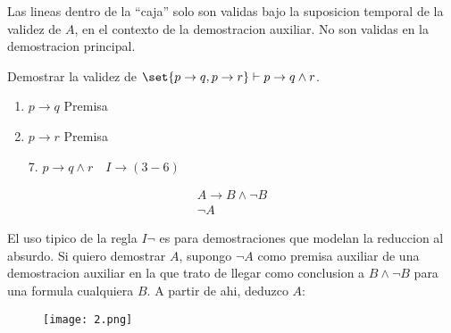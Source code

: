 \begin{remark}
	Las lineas dentro de la ``caja'' solo son validas bajo la suposicion temporal de la validez de \(A \), en el contexto de la demostracion auxiliar. No son validas en la demostracion principal.
\end{remark}

\begin{example}
	Demostrar la validez de \(\set{p\rightarrow q, p\rightarrow r } \vdash p \rightarrow q \wedge r \).

	\begin{enumerate}
		\item \(p \rightarrow q \) Premisa
		\item \(p \rightarrow r \) Premisa

	\end{enumerate}
	\begin{enumerate}[resume]
		\item[7.] \(p \to q \wedge r \quad I\to (3-6)\)
	\end{enumerate}
\end{example}

\begin{definition}
	\[
		\begin{array}{c}
			A \rightarrow B \wedge  \neg B \\ \hline
			\neg A
		\end{array}
	\]
\end{definition}

\begin{remark}
	El uso tipico de la regla \(I \neg \) es para demostraciones que modelan la reduccion al absurdo. Si quiero demostrar \(A \), supongo \(\neg A \) como premisa auxiliar de una demostracion auxiliar en la que trato de llegar como conclusion a \(B \wedge \neg B\) para una formula cualquiera \(B \). A partir de ahi, deduzco \(A \):
	\begin{figure}[H]
		\centering
		\texttt{[image: 2.png]}
		\label{fig:}
	\end{figure}
\end{remark}

